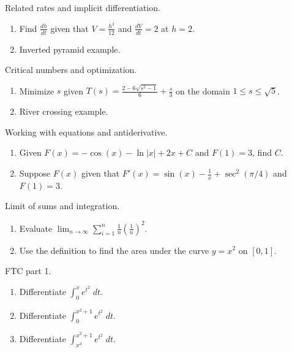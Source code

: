 \documentclass[../main.tex]{subfiles}
\begin{document}
Related rates and implicit differentiation.
\begin{enumerate}
  \item Find \(\frac{dh}{dt}\) given that \(V = \frac{h^{3}}{12}\) and \(\frac{dV}{dt} = 2\) at \(h = 2\).

  \item Inverted pyramid example.
\end{enumerate}

Critical numbers and optimization.
\begin{enumerate}
  \item Minimize \(s\) given \(T(s) = \frac{2 - 6\sqrt{s^{2} - 1}}{6} + \frac{s}{3}\) on the domain \(1 \le s \le \sqrt{5}\).
  \item River crossing example.
\end{enumerate}

Working with equations and antiderivative.
\begin{enumerate}
  \item Given \(F(x) = - \cos(x) - \ln|x| + 2x + C\) and \(F(1) = 3\), find \(C\).

  \item Suppose \(F(x)\) given that \(F'(x) = \sin(x) - \frac{1}{x} + \sec^{2}(\pi/4)\) and \(F(1) = 3\). 
\end{enumerate}

Limit of sums and integration.
\begin{enumerate}
  \item Evaluate \(\lim_{n \to \infty} \sum_{i=1}^{n} \frac{1}{n} \left( \frac{1}{n} \right)^{2}\).
  \item Use the definition to find the area under the curve \(y = x^{2}\) on \([0,1]\).
\end{enumerate}

FTC part 1.
\begin{enumerate}
  \item Differentiate \(\int_{0}^{x} e^{t^{2}} \;dt\).
  \item Differentiate \(\int_{0}^{x^{2}+1} e^{t^{2}} \;dt\).
  \item Differentiate \(\int_{x^{3}}^{x^{2}+1} e^{t^{2}} \;dt\).
\end{enumerate}
\end{document}

